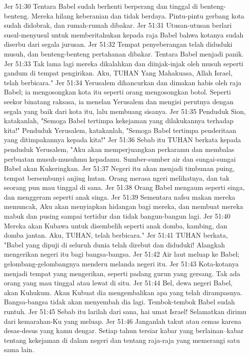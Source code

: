 Jer 51:30  Tentara Babel sudah berhenti berperang dan tinggal di benteng-benteng. Mereka hilang keberanian dan tidak berdaya. Pintu-pintu gerbang kota sudah didobrak, dan rumah-rumah dibakar.
Jer 51:31  Utusan-utusan berlari susul-menyusul untuk memberitahukan kepada raja Babel bahwa kotanya sudah diserbu dari segala jurusan.
Jer 51:32  Tempat penyeberangan telah diduduki musuh, dan benteng-benteng pertahanan dibakar. Tentara Babel menjadi panik.
Jer 51:33  Tak lama lagi mereka dikalahkan dan diinjak-injak oleh musuh seperti gandum di tempat pengirikan. Aku, TUHAN Yang Mahakuasa, Allah Israel, telah berbicara."
Jer 51:34  Yerusalem dihancurkan dan dimakan habis oleh raja Babel; ia mengosongkan kota itu seperti orang mengosongkan botol. Seperti seekor binatang raksasa, ia menelan Yerusalem dan mengisi perutnya dengan segala yang baik dari kota itu, lalu membuang sisanya.
Jer 51:35  Penduduk Sion, katakanlah, "Semoga Babel tertimpa kekejaman yang dilakukannya terhadap kita!" Penduduk Yerusalem, katakanlah, "Semoga Babel tertimpa penderitaan yang ditimpakannya kepada kita!"
Jer 51:36  Sebab itu TUHAN berkata kepada penduduk Yerusalem, "Aku akan memperjuangkan perkaramu dan membalas perbuatan musuh-musuhmu kepadamu. Sumber-sumber air dan sungai-sungai Babel akan Kukeringkan.
Jer 51:37  Negeri itu akan menjadi timbunan puing, tempat bersembunyi anjing hutan. Orang merasa ngeri melihatnya, dan tak seorang pun mau tinggal di sana.
Jer 51:38  Orang Babel mengaum seperti singa, dan menggeram seperti anak singa.
Jer 51:39  Sementara nafsu makan mereka memuncak, Aku akan menyiapkan hidangan bagi mereka, dan membuat mereka mabuk dan pusing sampai tertidur dan tidak bangun-bangun lagi.
Jer 51:40  Mereka akan Kubawa untuk disembelih seperti anak domba, kambing, dan domba jantan. Aku, TUHAN, telah berbicara."
Jer 51:41  TUHAN berkata, "Babel yang dipuji di seluruh dunia telah direbut dan diduduki! Alangkah mengerikan negeri itu bagi bangsa-bangsa.
Jer 51:42  Air laut meluap ke Babel; gelombang-gelombangnya menderu melanda negeri itu.
Jer 51:43  Kota-kotanya menjadi tempat yang mengerikan, seperti padang gurun yang gersang. Tak ada orang yang mau tinggal atau lewat di situ.
Jer 51:44  Bel, dewa negeri Babel, akan Kuhukum. Akan Kubuat dia mengembalikan apa yang telah dirampasnya. Bangsa-bangsa tidak akan menyembah dia lagi. Tembok-tembok Babel sudah runtuh.
Jer 51:45  Sebab itu larilah dari sana, hai umat Israel! Selamatkan dirimu dari kemarahan-Ku yang meluap.
Jer 51:46  Janganlah takut atau cemas karena desas-desus yang kamu dengar. Setiap tahun tersiar kabar yang berlainan--kabar tentang kekejaman di dalam negeri dan tentang raja-raja yang memerangi satu sama lain.

